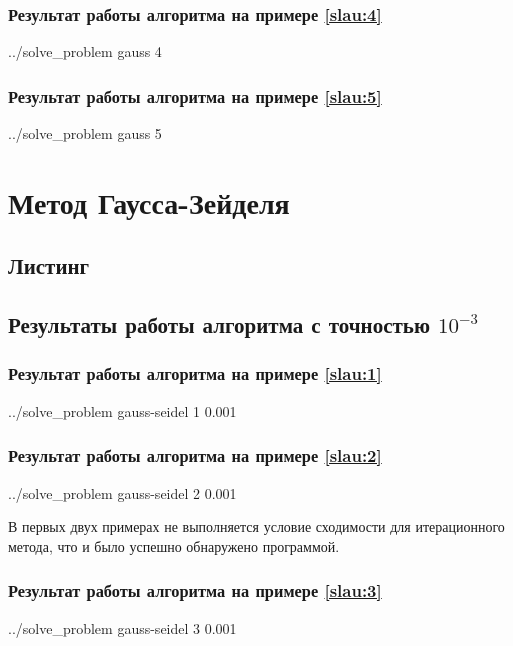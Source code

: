 \documentclass[a4paper]{article}
\begin{document}
\subsubsection{Результат работы алгоритма на примере \eqref{slau:4}}
\bash[stdout]
../solve_problem gauss 4
\END

\subsubsection{Результат работы алгоритма на примере \eqref{slau:5}}
\bash[stdout]
../solve_problem gauss 5
\END

\section{Метод Гаусса-Зейделя}

\subsection{Листинг}


\subsection{Результаты работы алгоритма с точностью $10^{-3}$}

\subsubsection{Результат работы алгоритма на примере \eqref{slau:1}}
\bash[stdout]
../solve_problem gauss-seidel 1 0.001
\END
\newline

\subsubsection{Результат работы алгоритма на примере \eqref{slau:2}}
\bash[stdout]
../solve_problem gauss-seidel 2 0.001
\END

В первых двух примерах не выполняется условие сходимости для итерационного метода, что и было успешно обнаружено программой.

\subsubsection{Результат работы алгоритма на примере \eqref{slau:3}}
\bash[stdout]
../solve_problem gauss-seidel 3 0.001
\END
\end{document}
